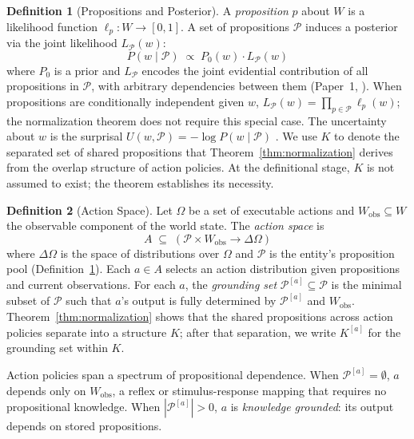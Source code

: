 \documentclass[11pt]{article}
\theoremstyle{definition}
\newtheorem{definition}{Definition}
\theoremstyle{remark}
\begin{document}
\begin{definition}[Propositions and Posterior]
\label{def:knowledge}
A \emph{proposition} $p$ about $W$ is a likelihood function
$\ell_p : W \to [0,1]$. A set of propositions $\mathcal{P}$ induces a
posterior via the joint likelihood $L_{\mathcal{P}}(w)$:
\[
P(w \mid \mathcal{P}) \;\propto\; P_0(w) \cdot L_{\mathcal{P}}(w)
\]
where $P_0$ is a prior and $L_{\mathcal{P}}$ encodes the joint
evidential contribution of all propositions in $\mathcal{P}$, with
arbitrary dependencies between them (Paper~1, \cite{McCarthy2026a}).
When propositions are conditionally independent given $w$,
$L_{\mathcal{P}}(w) = \prod_{p \in \mathcal{P}} \ell_p(w)$; the
normalization theorem does not require this special case. The uncertainty about $w$ is the surprisal
$U(w, \mathcal{P}) = -\log P(w \mid \mathcal{P})$ \cite{Shannon1948, Cover2006}.
We use $K$ to denote the separated set of shared propositions that
Theorem~\ref{thm:normalization} derives from the overlap structure of
action policies. At the definitional stage, $K$ is not assumed to
exist; the theorem establishes its necessity.
\end{definition}

\begin{definition}[Action Space]
\label{def:action}
Let $\Omega$ be a set of executable actions and $W_{\text{obs}} \subseteq W$
the observable component of the world state. The \emph{action space} is
\[
A \;\subseteq\; (\mathcal{P} \times W_{\text{obs}} \to \Delta \Omega)
\]
where $\Delta \Omega$ is the space of distributions over $\Omega$ and
$\mathcal{P}$ is the entity's proposition pool
(Definition~\ref{def:knowledge}). Each $a \in A$ selects an action
distribution given propositions and current observations. For each $a$,
the \emph{grounding set} $\mathcal{P}^{[a]} \subseteq \mathcal{P}$ is
the minimal subset of $\mathcal{P}$ such that $a$'s output is fully
determined by $\mathcal{P}^{[a]}$ and $W_{\text{obs}}$.
Theorem~\ref{thm:normalization} shows that the shared propositions
across action policies separate into a structure $K$; after that
separation, we write $K^{[a]}$ for the grounding set within $K$.

Action policies span a spectrum of propositional dependence. When
$\mathcal{P}^{[a]} = \emptyset$, $a$ depends only on
$W_{\text{obs}}$, a reflex or stimulus-response mapping that requires
no propositional knowledge. When $|\mathcal{P}^{[a]}| > 0$, $a$ is
\emph{knowledge grounded}: its output depends on stored propositions.
\end{definition}
\end{document}
